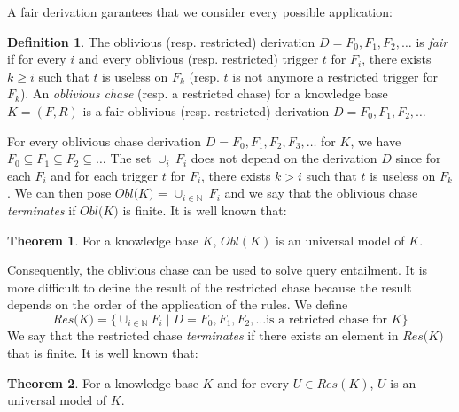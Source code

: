 \documentclass{article}
\theoremstyle{definition}
\newtheorem{definition}{Definition}[section]
\newtheorem{theorem}{Theorem}[section]
\theoremstyle{remark}
\def \N {\mathbb N}
\begin{document}
A fair derivation garantees that we consider every possible application:

\begin{definition}
The oblivious (resp. restricted) derivation $D=F_0,F_1,F_2,\ldots$ is \emph{fair} if for every $i$ and every oblivious (resp. restricted) trigger $t$ for $F_i$, there exists $k \geq i$ such that $t$ is useless on $F_k$ (resp. $t$ is not anymore a restricted trigger for $F_k$). An \emph{oblivious chase} (resp. a restricted chase) for a knowledge base $K= (F,R)$ is a fair oblivious (resp. restricted) derivation $D=F_0,F_1,F_2,\ldots$ 
\end{definition}

For every oblivious chase derivation $D = F_0,F_1,F_2,F_3,\ldots$ for $K$, we have $F_0 \subseteq F_1 \subseteq F_2 \subseteq \ldots$ The set $\cup_i~F_i$ does not depend on the derivation $D$ since for each $F_i$ and for each trigger $t$ for $F_i$, there exists $k>i$ such that $t$ is useless on $F_k$. We can then pose \emph{$\textit{Obl(K)}$} = $\cup_{i \in \N}~F_i$ and we say that the oblivious chase \emph{terminates} if $\textit{Obl(K)}$ is finite. It is well known that:

\begin{theorem}
For a knowledge base $K$, $\textit{Obl}(K)$ is an universal model of $K$.
\end{theorem}

Consequently, the oblivious chase can be used to solve query entailment. It is more difficult to define the result of the restricted chase because the result depends on the order of the application of the rules. We define $$\textit{Res(K)}=\{\cup_{i \in \N}F_i \mid D = F_0,F_1,F_2,\ldots \text{is a retricted chase for } K\}$$ We say that the restricted chase \emph{terminates} if there exists an element in $\textit{Res(K)}$ that is finite. It is well known that:

\begin{theorem}
For a knowledge base $K$ and for every $U \in \textit{Res}(K)$, $U$ is an universal model of $K$.
\end{theorem}
\end{document}
